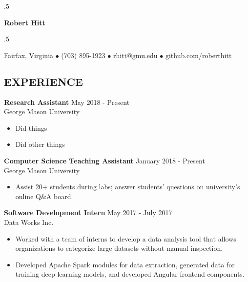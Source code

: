 \documentclass[11pt]{res} %
\begin{document}

\moveleft.5\hoffset\centerline{\large\bf Robert Hitt} %

\moveleft.5\hoffset\centerline{Fairfax, Virginia  $\bullet$  (703) 895-1923  $\bullet$  rhitt@gmu.edu  $\bullet$  github.com/roberthitt}

\vspace{-15pt}
\noindent\makebox[\linewidth]{\rule{\textwidth}{1pt}}


\begin{resume}


\vspace{-22pt}\section{EXPERIENCE} \smallskip

\textbf{Research Assistant} \hfill May 2018 - Present \\
George Mason University\smallskip
\begin{itemize}
\item Did things
\item Did other things
\end{itemize}

\vspace{-8pt}\textbf{Computer Science Teaching Assistant} \hfill January 2018 - Present \\
George Mason University\smallskip
\begin{itemize}
\item Assist 20+ students during labs; answer students' questions on university's online Q\&A board.
\end{itemize}

\vspace{-8pt}\textbf{Software Development Intern} \hfill May 2017 - July 2017 \\
Data Works Inc.\smallskip
\begin{itemize}
\item Worked with a team of interns to develop a data analysis tool that allows organizations to categorize large datasets without manual inspection.
\item Developed Apache Spark modules for data extraction, generated data for training deep learning models, and developed Angular frontend components.
\end{itemize}


\end{resume}
\end{document}
